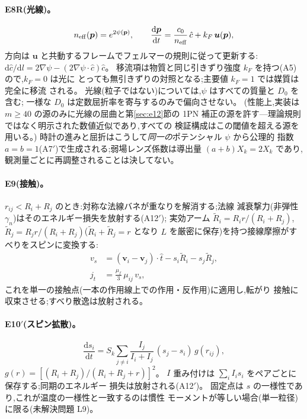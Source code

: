 \documentclass[a4paper,10pt,twocolumn]{ltjsarticle}
\newcommand{\ud}{\mathrm{d}}
\newcommand{\vect}[1]{\bm{#1}}
\newcommand{\Kt}{X_k}
\newcommand{\Dz}{D_0}
\begin{document}
\paragraph*{E8R(光線)。}
\begin{equation}
n_{\rm eff}(\vect{p}) = e^{2\psi(\vect{p})},\qquad
\frac{\ud\vect{p}}{\ud t}
 = \frac{c_0}{n_{\rm eff}}\,\hat{c} + k_F\,\vect{u}(\vect{p}),
\label{eq:E8}
\end{equation}
方向は $\vect{u}$ と共動するフレームでフェルマーの規則に従って更新する:
$\ud\hat{c}/\ud l = 2\nabla\psi - (2\nabla\psi\cdot\hat{c})\hat{c}$。
移流項は物質と同じ引きずり強度 $k_F$ を持つ(A5)ので,$k_F = 0$ は光に
とっても無引きずりの対照となる;主要値 $k_F = 1$ では媒質は完全に移流
される。
光線(粒子ではない)については,$\psi$ はすべての質量と $\Dz$ を含む;
一様な $\Dz$ は定数屈折率を寄与するのみで偏向させない。
(性能上,実装は $m \ge 40$ の源のみに光線の屈曲と第\ref{sec:e12}節の
1PN 補正の源を許す---理論規則ではなく明示された数値近似であり,すべての
検証構成はこの閾値を超える源を用いる。)
時計の進みと屈折はこうして\emph{同一の}ポテンシャル $\psi$ から公理的
指数 $a = b = 1$(A7$'$)で生成される;弱場レンズ係数は導出量
$(a+b)\Kt = 2\Kt$ であり,観測量ごとに再調整されることは決してない。

\paragraph*{E9(接触)。}
$r_{ij} < R_i + R_j$ のとき:対称な法線バネが重なりを解消する;法線
減衰撃力(非弾性 $\gamma_n$)はそのエネルギー損失を放射する(A12$'$);
実効アーム $\tilde R_i = R_i r/(R_i{+}R_j)$,
$\tilde R_j = R_j r/(R_i{+}R_j)$($\tilde R_i + \tilde R_j = r$ となり
$L$ を厳密に保存)を持つ接線摩擦がすべりをスピンに変換する:
\begin{align}
v_s &= (\vect{v}_i-\vect{v}_j)\cdot\hat{t}
 - s_i\tilde R_i - s_j\tilde R_j,\nonumber\\
j_t &= \tfrac{\mu_f}{3}\,\mu_{ij}\,v_s,
\label{eq:E9}
\end{align}
これを単一の接触点(一本の作用線上での作用・反作用)に適用し,転がり
接触に収束させる;すべり散逸は放射される。

\paragraph*{E10$'$(スピン拡散)。}
\begin{equation}
\frac{\ud s_i}{\ud t} = S_k\sum_{j\ne i}
 \frac{I_j}{I_i+I_j}\,(s_j-s_i)\,g(r_{ij}),
\label{eq:E10}
\end{equation}
$g(r) = [(R_i{+}R_j)/(R_i{+}R_j{+}r)]^2$。
$I$ 重み付けは $\sum_i I_i s_i$ をペアごとに保存する;同期のエネルギー
損失は放射される(A12$'$)。
固定点は $s$ の一様性であり,これが温度の一様性と一致するのは慣性
モーメントが等しい場合(単一粒径)に限る(未解決問題 L9)。
\end{document}
